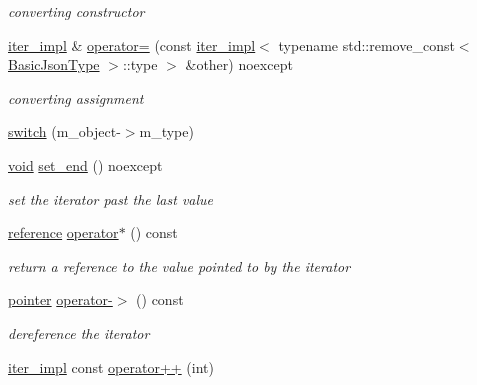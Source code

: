 \begin{DoxyCompactItemize}
\begin{DoxyCompactList}\small\item\em converting constructor \end{DoxyCompactList}\item 
\hyperlink{classnlohmann_1_1detail_1_1iter__impl}{iter\+\_\+impl} \& \hyperlink{classnlohmann_1_1detail_1_1iter__impl_a7159ed1cfe7c423a2baef8bea0c94509}{operator=} (const \hyperlink{classnlohmann_1_1detail_1_1iter__impl}{iter\+\_\+impl}$<$ typename std\+::remove\+\_\+const$<$ \hyperlink{classnlohmann_1_1detail_1_1iter__impl_abf18f18793f84b0222aebb5a2a87da7a}{Basic\+Json\+Type} $>$\+::type $>$ \&other) noexcept
\begin{DoxyCompactList}\small\item\em converting assignment \end{DoxyCompactList}\item 
\hyperlink{classnlohmann_1_1detail_1_1iter__impl_abc2f80067020fae59d7fbccf39f1547a}{switch} (m\+\_\+object-\/$>$m\+\_\+type)
\item 
\hyperlink{namespacenlohmann_1_1detail_a59fca69799f6b9e366710cb9043aa77d}{void} \hyperlink{classnlohmann_1_1detail_1_1iter__impl_a23e50ad4c13aa62d9ac7f60a123823ee}{set\+\_\+end} () noexcept
\begin{DoxyCompactList}\small\item\em set the iterator past the last value \end{DoxyCompactList}\item 
\hyperlink{classnlohmann_1_1detail_1_1iter__impl_a5be8001be099c6b82310f4d387b953ce}{reference} \hyperlink{classnlohmann_1_1detail_1_1iter__impl_adafa65198cad0cc7295d21cfa7678e6e}{operator$\ast$} () const 
\begin{DoxyCompactList}\small\item\em return a reference to the value pointed to by the iterator \end{DoxyCompactList}\item 
\hyperlink{classnlohmann_1_1detail_1_1iter__impl_a69e52f890ce8c556fd68ce109e24b360}{pointer} \hyperlink{classnlohmann_1_1detail_1_1iter__impl_a28a0c92903edd8f86825c8c7784b0913}{operator-\/$>$} () const 
\begin{DoxyCompactList}\small\item\em dereference the iterator \end{DoxyCompactList}\item 
\hyperlink{classnlohmann_1_1detail_1_1iter__impl}{iter\+\_\+impl} const \hyperlink{classnlohmann_1_1detail_1_1iter__impl_a7d2397773b2dce42f30f0375a6a1d850}{operator++} (int)

\end{DoxyCompactItemize}

